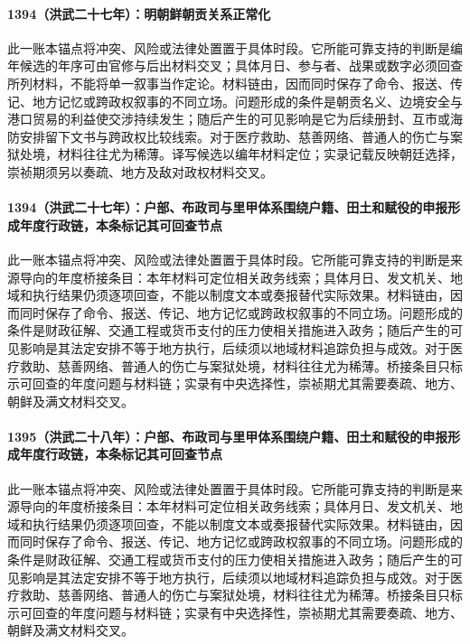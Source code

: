 \paragraph{1394（洪武二十七年）：明朝鲜朝贡关系正常化} 此一账本锚点将冲突、风险或法律处置置于具体时段。它所能可靠支持的判断是编年候选的年序可由官修与后出材料交叉；具体月日、参与者、战果或数字必须回查所列材料，不能将单一叙事当作定论。材料链由，因而同时保存了命令、报送、传记、地方记忆或跨政权叙事的不同立场。问题形成的条件是朝贡名义、边境安全与港口贸易的利益使交涉持续发生；随后产生的可见影响是它为后续册封、互市或海防安排留下文书与跨政权比较线索。对于医疗救助、慈善网络、普通人的伤亡与案狱处境，材料往往尤为稀薄。译写候选以编年材料定位；实录记载反映朝廷选择，崇祯期须另以奏疏、地方及敌对政权材料交叉。

\paragraph{1394（洪武二十七年）：户部、布政司与里甲体系围绕户籍、田土和赋役的申报形成年度行政链，本条标记其可回查节点} 此一账本锚点将冲突、风险或法律处置置于具体时段。它所能可靠支持的判断是来源导向的年度桥接条目：本年材料可定位相关政务线索；具体月日、发文机关、地域和执行结果仍须逐项回查，不能以制度文本或奏报替代实际效果。材料链由，因而同时保存了命令、报送、传记、地方记忆或跨政权叙事的不同立场。问题形成的条件是财政征解、交通工程或货币支付的压力使相关措施进入政务；随后产生的可见影响是其法定安排不等于地方执行，后续须以地域材料追踪负担与成效。对于医疗救助、慈善网络、普通人的伤亡与案狱处境，材料往往尤为稀薄。桥接条目只标示可回查的年度问题与材料链；实录有中央选择性，崇祯期尤其需要奏疏、地方、朝鲜及满文材料交叉。

\paragraph{1395（洪武二十八年）：户部、布政司与里甲体系围绕户籍、田土和赋役的申报形成年度行政链，本条标记其可回查节点} 此一账本锚点将冲突、风险或法律处置置于具体时段。它所能可靠支持的判断是来源导向的年度桥接条目：本年材料可定位相关政务线索；具体月日、发文机关、地域和执行结果仍须逐项回查，不能以制度文本或奏报替代实际效果。材料链由，因而同时保存了命令、报送、传记、地方记忆或跨政权叙事的不同立场。问题形成的条件是财政征解、交通工程或货币支付的压力使相关措施进入政务；随后产生的可见影响是其法定安排不等于地方执行，后续须以地域材料追踪负担与成效。对于医疗救助、慈善网络、普通人的伤亡与案狱处境，材料往往尤为稀薄。桥接条目只标示可回查的年度问题与材料链；实录有中央选择性，崇祯期尤其需要奏疏、地方、朝鲜及满文材料交叉。


